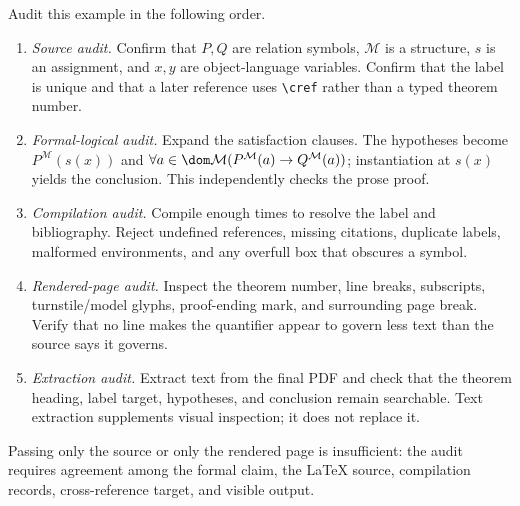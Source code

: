 Audit this example in the following order.
\begin{enumerate}
  \item \emph{Source audit.}  Confirm that \(P,Q\) are relation symbols,
        \(\mathcal M\) is a structure, \(s\) is an assignment, and \(x,y\) are
        object-language variables.  Confirm that the label is unique and that
        a later reference uses \verb|\cref| rather than a typed theorem number.
  \item \emph{Formal-logical audit.}  Expand the satisfaction clauses.  The
        hypotheses become \(P^{\mathcal M}(s(x))\) and
        \(\forall a\in\dom\mathcal M
        (P^{\mathcal M}(a)\to Q^{\mathcal M}(a))\); instantiation at \(s(x)\)
        yields the conclusion.  This independently checks the prose proof.
  \item \emph{Compilation audit.}  Compile enough times to resolve the label
        and bibliography.  Reject undefined references, missing citations,
        duplicate labels, malformed environments, and any overfull box that
        obscures a symbol.
  \item \emph{Rendered-page audit.}  Inspect the theorem number, line breaks,
        subscripts, turnstile/model glyphs, proof-ending mark, and surrounding
        page break.  Verify that no line makes the quantifier appear to govern
        less text than the source says it governs.
  \item \emph{Extraction audit.}  Extract text from the final PDF and check that
        the theorem heading, label target, hypotheses, and conclusion remain
        searchable.  Text extraction supplements visual inspection; it does
        not replace it.
\end{enumerate}
Passing only the source or only the rendered page is insufficient: the audit
requires agreement among the formal claim, the LaTeX source, compilation
records, cross-reference target, and visible output.

